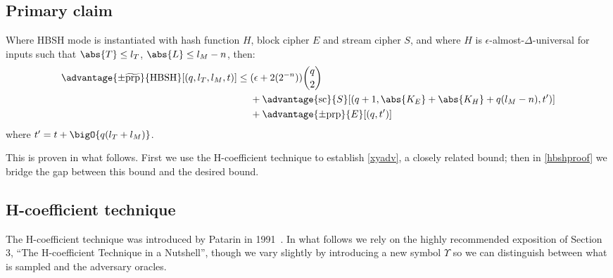 \documentclass[eprint.tex]{subfiles}
\begin{document}
\subsection{Primary claim}
\begin{theorem}\label{hbshadvantage}
    Where HBSH mode is instantiated with hash function $H$, block cipher $E$ and stream cipher $S$,
    and where $H$ is $\epsilon$-almost-$\Delta$-universal for inputs such that
    $\abs{T} \leq l_T$, $\abs{L} \leq l_M - n$, then:
    \begin{align*}
        \advantage{\pm \widetilde{\mathrm{prp}}}{\HBSH}[(q, l_T, l_M, t)]
        \leq {}&(\epsilon + 2(2^{-n}))\binom{q}{2} \\
        {}&+ \advantage{\mathrm{sc}}{S}[(q + 1, \abs{K_E} + \abs{K_H} + q(l_M - n), t')] \\
        {}&+ \advantage{\pm \mathrm{prp}}{E}[(q, t')]\\
    \end{align*}
    where $t' = t + \bigO{q(l_T + l_M)}$.
\end{theorem}

This is proven in what follows. First we use the H-coefficient technique to establish
\autoref{xyadv}, a closely related bound; then in \autoref{hbshproof} we bridge the
gap between this bound and the desired bound.

\subsection{H-coefficient technique}
The H-coefficient technique was introduced by Patarin in 1991~\cite{ppdes,hco}.
In what follows we rely on the highly recommended exposition of
\cite{hco2} Section 3,
``The H-coefficient Technique in a Nutshell'', though we vary slightly by introducing
a new symbol $\Upsilon$ so we can distinguish between what is sampled and the adversary oracles.
\end{document}
